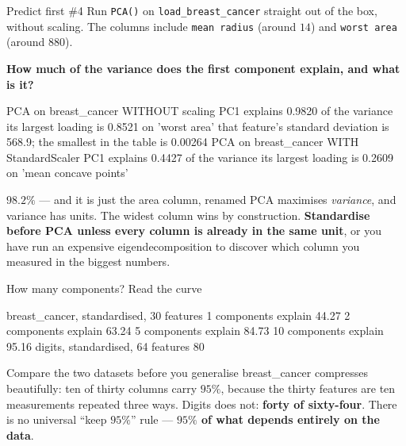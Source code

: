 \documentclass[aspectratio=169]{beamer}
\begin{document}
\begin{frame}[fragile,shrink=8]{Predict first \#4}
Run \texttt{PCA()} on \texttt{load\_breast\_cancer} straight out of the box,
without scaling. The columns include \texttt{mean radius} (around $14$) and
\texttt{worst area} (around $880$).

\begin{center}
  \textbf{How much of the variance does the first component explain, and what
  is it?}
\end{center}
\vspace{0.2em}
\begin{outblk}
PCA on breast_cancer WITHOUT scaling
   PC1 explains 0.9820 of the variance
   its largest loading is 0.8521 on 'worst area'
   that feature's standard deviation is 568.9; the smallest in the table is 0.00264
PCA on breast_cancer WITH StandardScaler
   PC1 explains 0.4427 of the variance
   its largest loading is 0.2609 on 'mean concave points'
\end{outblk}
\begin{alertblock}{$98.2\%$ --- and it is just the area column, renamed}
  \footnotesize PCA maximises \emph{variance}, and variance has units. The
  widest column wins by construction. \textbf{Standardise before PCA unless
  every column is already in the same unit}, or you have run an expensive
  eigendecomposition to discover which column you measured in the biggest
  numbers.
\end{alertblock}
\end{frame}

\begin{frame}[fragile,shrink=6]{How many components? Read the curve}
\begin{outblk}
breast_cancer, standardised, 30 features
    1 components explain  44.27%
    2 components explain  63.24%
    5 components explain  84.73%
   10 components explain  95.16%
digits, standardised, 64 features
   80%
\end{outblk}
\begin{alertblock}{Compare the two datasets before you generalise}
  \footnotesize breast\_cancer compresses beautifully: ten of thirty columns
  carry $95\%$, because the thirty features are ten measurements repeated
  three ways. Digits does not: \textbf{forty of sixty-four}. There is no
  universal ``keep $95\%$'' rule --- \textbf{$95\%$ of what depends entirely
  on the data}.
\end{alertblock}
\end{frame}
\end{document}
